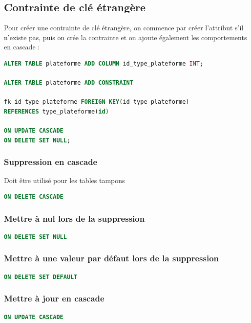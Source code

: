 \subsection{Contrainte de clé étrangère}
Pour créer une contrainte de clé étrangère, on commence par créer l'attribut s'il n'existe pas, puis on crée la contrainte et on ajoute également les comportements en cascade :

\begin{lstlisting}[language=SQL]
ALTER TABLE plateforme ADD COLUMN id_type_plateforme INT;

ALTER TABLE plateforme ADD CONSTRAINT

fk_id_type_plateforme FOREIGN KEY(id_type_plateforme)
REFERENCES type_plateforme(id)

ON UPDATE CASCADE
ON DELETE SET NULL;
\end{lstlisting}

\subsubsection{Suppression en cascade}
Doit être utilisé pour les tables tampons
\begin{lstlisting}[language=SQL]
ON DELETE CASCADE
\end{lstlisting}

\subsubsection{Mettre à nul lors de la suppression}
\begin{lstlisting}[language=SQL]
ON DELETE SET NULL
\end{lstlisting}

\subsubsection{Mettre à une valeur par défaut lors de la suppression}
\begin{lstlisting}[language=SQL]
ON DELETE SET DEFAULT
\end{lstlisting}

\subsubsection{Mettre à jour en cascade}
\begin{lstlisting}[language=SQL]
ON UPDATE CASCADE
\end{lstlisting}

